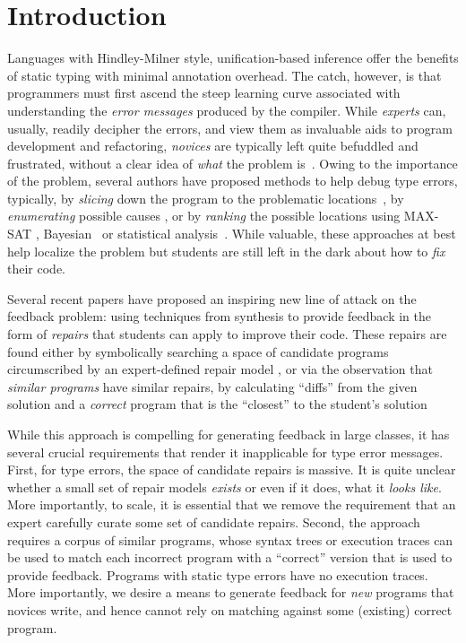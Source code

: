 \section{Introduction}
\label{sec:intro}

%
Languages with Hindley-Milner style, unification-based inference
offer the benefits of static typing with minimal annotation overhead.
The catch, however, is that programmers must first ascend the steep
learning curve associated with understanding the \emph{error messages}
produced by the compiler.
%
While \emph{experts} can, usually, readily decipher the errors, and
view them as invaluable aids to program development and refactoring,
\emph{novices} are typically left quite befuddled and frustrated,
without a clear idea of \emph{what} the problem is~\citep{Wand1986-nw}.
%
Owing to the importance of the problem, several authors have proposed methods to
help debug type errors, typically, by \emph{slicing} down the program to the
problematic locations~\citep{Haack2003-vc, Rahli2015-tt}, by \emph{enumerating}
possible causes \citep{Lerner2007-dt, Chen2014-gd}, or by \emph{ranking} the
possible locations using MAX-SAT
\citep{Pavlinovic2014-mr}, Bayesian~\citep{Zhang2014-lv}
or statistical analysis~\citep{Seidel:2017}.
%
While valuable, these approaches at best help localize
the problem but students are still left in the dark
about how to \emph{fix} their code.

%
Several recent papers have proposed an inspiring new line of
attack on the feedback problem: using techniques from synthesis
to provide feedback in the form of \emph{repairs} that students
can apply to improve their code.
%
These repairs are found either by symbolically searching a space of candidate
programs circumscribed by an expert-defined repair model
\citep{singh2013,HeadGSSFDH17}, or via the observation that \emph{similar
programs} have similar repairs, \ie by calculating ``diffs'' from the given
solution and a \emph{correct} program that is the ``closest'' to the student's
solution ~\citep{Gulwani_2018,Wang_2018}

While this approach is compelling for generating feedback in large
classes, it has several crucial requirements that render it inapplicable
for type error messages.
%
First, for type errors, the space of candidate repairs is massive.
It is quite unclear whether a small set of repair models \emph{exists}
or even if it does, what it \emph{looks like}. More importantly,
to scale, it is essential that we remove the requirement that an
expert carefully curate some set of candidate repairs.
%
Second, the approach requires a corpus of similar programs,
whose syntax trees or execution traces can be used to match
each incorrect program with a ``correct'' version that is
used to provide feedback. Programs with static type errors
have no execution traces.
%
More importantly, we desire a means to generate feedback
for \emph{new} programs that novices write, and hence
cannot rely on matching against some (existing) correct
program.

